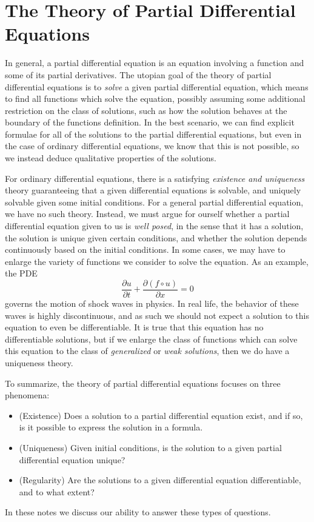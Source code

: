 \section{The Theory of Partial Differential Equations}

In general, a partial differential equation is an equation involving a function and some of its partial derivatives. The utopian goal of the theory of partial differential equations is to {\it solve} a given partial differential equation, which means to find all functions which solve the equation, possibly assuming some additional restriction on the class of solutions, such as how the solution behaves at the boundary of the functions definition. In the best scenario, we can find explicit formulae for all of the solutions to the partial differential equations, but even in the case of ordinary differential equations, we know that this is not possible, so we instead deduce qualitative properties of the solutions.

For ordinary differential equations, there is a satisfying {\it existence and uniqueness} theory guaranteeing that a given differential equations is solvable, and uniquely solvable given some initial conditions. For a general partial differential equation, we have no such theory. Instead, we must argue for ourself whether a partial differential equation given to us is {\it well posed}, in the sense that it has a solution, the solution is unique given certain conditions, and whether the solution depends continuously based on the initial conditions. In some cases, we may have to enlarge the variety of functions we consider to solve the equation. As an example, the PDE
%
\[ \frac{\partial u}{\partial t} + \frac{\partial (f \circ u)}{\partial x} = 0 \]
%
governs the motion of shock waves in physics. In real life, the behavior of these waves is highly discontinuous, and as such we should not expect a solution to this equation to even be differentiable. It is true that this equation has no differentiable solutions, but if we enlarge the class of functions which can solve this equation to the class of {\it generalized} or {\it weak solutions}, then we do have a uniqueness theory.

To summarize, the theory of partial differential equations focuses on three phenomena:
%
\begin{itemize}
    \item (Existence) Does a solution to a partial differential equation exist, and if so, is it possible to express the solution in a formula.

    \item (Uniqueness) Given initial conditions, is the solution to a given partial differential equation unique?

    \item (Regularity) Are the solutions to a given differential equation differentiable, and to what extent?
\end{itemize}
%
In these notes we discuss our ability to answer these types of questions.

